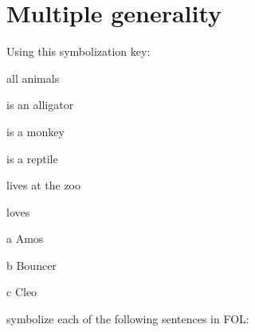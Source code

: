 \chapter{Multiple generality}\setcounter{ProbPart}{0}
\problempart
Using this symbolization key:
\begin{ekey}
\item[\text{论域}] all animals
\item[\atom{A}{x}]  is an alligator
\item[\atom{M}{x}]  is a monkey
\item[\atom{R}{x}]  is a reptile
\item[\atom{Z}{x}]  lives at the zoo
\item[\atom{L}{x,y}]  loves 
\item[a] Amos
\item[b] Bouncer
\item[c] Cleo
\end{ekey}
symbolize each of the following sentences in FOL:
